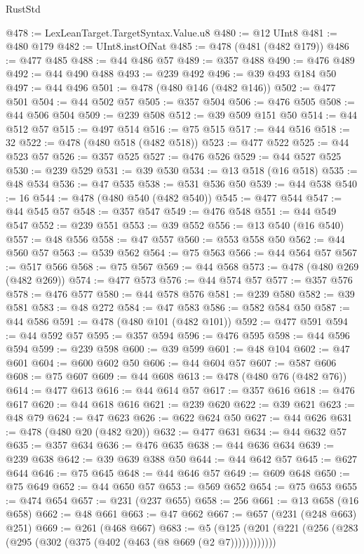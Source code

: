 \begin{lexlean}{RustStd}
\begin{coremodule}
@478 := LexLeanTarget.TargetSyntax.Value.u8
@480 := @12 UInt8
@481 := @480 @179
@482 := UInt8.instOfNat
@485 := @478 (@481 (@482 @179))
@486 := @477 @485
@488 := @44 @486 @57
@489 := @357 @488
@490 := @476 @489
@492 := @44 @490 @488
@493 := @239 @492
@496 := @39 @493 @184 @50
@497 := @44 @496
@501 := @478 (@480 @146 (@482 @146))
@502 := @477 @501
@504 := @44 @502 @57
@505 := @357 @504
@506 := @476 @505
@508 := @44 @506 @504
@509 := @239 @508
@512 := @39 @509 @151 @50
@514 := @44 @512 @57
@515 := @497 @514
@516 := @75 @515
@517 := @44 @516
@518 := 32
@522 := @478 (@480 @518 (@482 @518))
@523 := @477 @522
@525 := @44 @523 @57
@526 := @357 @525
@527 := @476 @526
@529 := @44 @527 @525
@530 := @239 @529
@531 := @39 @530
@534 := @13 @518 (@16 @518)
@535 := @48 @534
@536 := @47 @535
@538 := @531 @536 @50
@539 := @44 @538
@540 := 16
@544 := @478 (@480 @540 (@482 @540))
@545 := @477 @544
@547 := @44 @545 @57
@548 := @357 @547
@549 := @476 @548
@551 := @44 @549 @547
@552 := @239 @551
@553 := @39 @552
@556 := @13 @540 (@16 @540)
@557 := @48 @556
@558 := @47 @557
@560 := @553 @558 @50
@562 := @44 @560 @57
@563 := @539 @562
@564 := @75 @563
@566 := @44 @564 @57
@567 := @517 @566
@568 := @75 @567
@569 := @44 @568
@573 := @478 (@480 @269 (@482 @269))
@574 := @477 @573
@576 := @44 @574 @57
@577 := @357 @576
@578 := @476 @577
@580 := @44 @578 @576
@581 := @239 @580
@582 := @39 @581
@583 := @48 @272
@584 := @47 @583
@586 := @582 @584 @50
@587 := @44 @586
@591 := @478 (@480 @101 (@482 @101))
@592 := @477 @591
@594 := @44 @592 @57
@595 := @357 @594
@596 := @476 @595
@598 := @44 @596 @594
@599 := @239 @598
@600 := @39 @599
@601 := @48 @104
@602 := @47 @601
@604 := @600 @602 @50
@606 := @44 @604 @57
@607 := @587 @606
@608 := @75 @607
@609 := @44 @608
@613 := @478 (@480 @76 (@482 @76))
@614 := @477 @613
@616 := @44 @614 @57
@617 := @357 @616
@618 := @476 @617
@620 := @44 @618 @616
@621 := @239 @620
@622 := @39 @621
@623 := @48 @79
@624 := @47 @623
@626 := @622 @624 @50
@627 := @44 @626
@631 := @478 (@480 @20 (@482 @20))
@632 := @477 @631
@634 := @44 @632 @57
@635 := @357 @634
@636 := @476 @635
@638 := @44 @636 @634
@639 := @239 @638
@642 := @39 @639 @388 @50
@644 := @44 @642 @57
@645 := @627 @644
@646 := @75 @645
@648 := @44 @646 @57
@649 := @609 @648
@650 := @75 @649
@652 := @44 @650 @57
@653 := @569 @652
@654 := @75 @653
@655 := @474 @654
@657 := @231 (@237 @655)
@658 := 256
@661 := @13 @658 (@16 @658)
@662 := @48 @661
@663 := @47 @662
@667 := @657 (@231 (@248 @663) @251)
@669 := @261 (@468 @667)
@683 := @5 (@125 (@201 (@221 (@256 (@283 (@295 (@302 (@375 (@402 (@463 (@8 @669 (@2 @7))))))))))))

\end{coremodule}
\end{lexlean}
